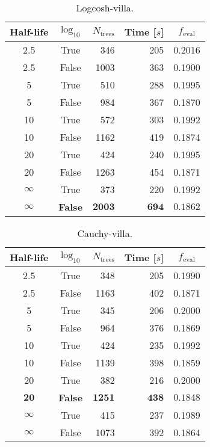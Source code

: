 
\begin{table}[h!]
  \begin{tabular}{@{}ccrrc@{}}
    Half-life & $\log_{10}$ & $N_\mathrm{trees}$ & Time [$s$] & $f_\mathrm{eval}$ \\
    \midrule
    \num{2.5} & True & \num{346} & \num{205} & \num{0.2016} \\
    \num{2.5} & False & \num{1003} & \num{363} & \num{0.1900} \\
    \num{5} & True & \num{510} & \num{288} & \num{0.1995} \\
    \num{5} & False & \num{984} & \num{367} & \num{0.1870} \\
    \num{10} & True & \num{572} & \num{303} & \num{0.1992} \\
    \num{10} & False & \num{1162} & \num{419} & \num{0.1874} \\
    \num{20} & True & \num{424} & \num{240} & \num{0.1995} \\
    \num{20} & False & \num{1263} & \num{454} & \num{0.1871} \\
    $\infty$ & True & \num{373} & \num{220} & \num{0.1992} \\
    $\bm{\infty}$ & \textbf{False} & $\mathbf{2003}$ & $\mathbf{694}$ & $\mathbf{0.1862}$ \\
  \end{tabular}
  \caption{\label{tab:h:HPO_initial_Logcosh-villa}Logcosh-villa.}
\end{table}


\begin{table}[h!]
  \begin{tabular}{@{}ccrrc@{}}
    Half-life & $\log_{10}$ & $N_\mathrm{trees}$ & Time [$s$] & $f_\mathrm{eval}$ \\
    \midrule
    \num{2.5} & True & \num{348} & \num{205} & \num{0.1990} \\
    \num{2.5} & False & \num{1163} & \num{402} & \num{0.1871} \\
    \num{5} & True & \num{345} & \num{206} & \num{0.2000} \\
    \num{5} & False & \num{964} & \num{376} & \num{0.1869} \\
    \num{10} & True & \num{424} & \num{235} & \num{0.1992} \\
    \num{10} & False & \num{1139} & \num{398} & \num{0.1859} \\
    \num{20} & True & \num{382} & \num{216} & \num{0.2000} \\
    $\mathbf{20}$ & \textbf{False} & $\mathbf{1251}$ & $\mathbf{438}$ & $\mathbf{0.1848}$ \\
    $\infty$ & True & \num{415} & \num{237} & \num{0.1989} \\
    $\infty$ & False & \num{1073} & \num{392} & \num{0.1864} \\
  \end{tabular}
  \caption{\label{tab:h:HPO_initial_Cauchy-villa}Cauchy-villa.}
\end{table}

